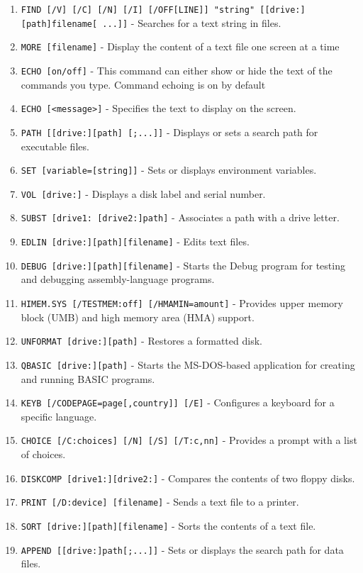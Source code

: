 \begin{enumerate}
    \item \texttt{FIND [/V] [/C] [/N] [/I] [/OFF[LINE]] "string" [[drive:][path]filename[ ...]]} - Searches for a text string in files.
    \item \texttt{MORE [filename]} - Display the content of a text file one screen at a time
    \item \texttt{ECHO [on/off]} - This command can either show or hide the text of the commands you type. Command echoing is on by default
    \item \texttt{ECHO [<message>]} - Specifies the text to display on the screen.
    \item \texttt{PATH [[drive:][path] [;...]]} - Displays or sets a search path for executable files.
    \item \texttt{SET [variable=[string]]} - Sets or displays environment variables.
    \item \texttt{VOL [drive:]} - Displays a disk label and serial number.
    \item \texttt{SUBST [drive1: [drive2:]path]} - Associates a path with a drive letter.
    \item \texttt{EDLIN [drive:][path][filename]} - Edits text files.
    \item \texttt{DEBUG [drive:][path][filename]} - Starts the Debug program for testing and debugging assembly-language programs.
    \item \texttt{HIMEM.SYS [/TESTMEM:off] [/HMAMIN=amount]} - Provides upper memory block (UMB) and high memory area (HMA) support.
    \item \texttt{UNFORMAT [drive:][path]} - Restores a formatted disk.
    \item \texttt{QBASIC [drive:][path]} - Starts the MS-DOS-based application for creating and running BASIC programs.
    \item \texttt{KEYB [/CODEPAGE=page[,country]] [/E]} - Configures a keyboard for a specific language.
    \item \texttt{CHOICE [/C:choices] [/N] [/S] [/T:c,nn]} - Provides a prompt with a list of choices.
    \item \texttt{DISKCOMP [drive1:][drive2:]} - Compares the contents of two floppy disks.
    \item \texttt{PRINT [/D:device] [filename]} - Sends a text file to a printer.
    \item \texttt{SORT [drive:][path][filename]} - Sorts the contents of a text file.
    \item \texttt{APPEND [[drive:]path[;...]]} - Sets or displays the search path for data files.

\end{enumerate}
